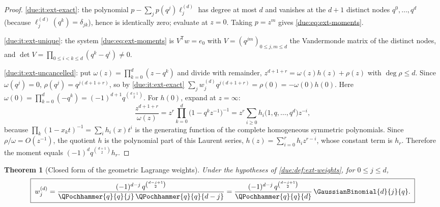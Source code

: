 \documentclass[11pt,oneside]{article}
\theoremstyle{plain}
\newtheorem{theorem}{Theorem}[section]
\theoremstyle{definition}
\theoremstyle{remark}
\newcommand{\Wrow}[2]{w^{(#1)}_{#2}}                        %
\begin{document}
\begin{proof}
\ref{due:it:ext-exact}: the polynomial $p-\sum_{j}p(q^{j})\ell^{(d)}_{j}$ has
degree at most $d$ and vanishes at the $d+1$ distinct nodes $q^{0},\ldots,q^{d}$
(because $\ell^{(d)}_{j}(q^{k})=\delta_{jk}$), hence is identically zero;
evaluate at $z=0$.  Taking $p=z^{m}$ gives \cref{due:eq:ext-moments}.

\ref{due:it:ext-unique}: the system \cref{due:eq:ext-moments} is
$V^{\mathsf T}w=e_{0}$ with $V=(q^{jm})_{0\le j,m\le d}$ the Vandermonde matrix
of the distinct nodes, and $\det V=\prod_{0\le i<k\le d}(q^{k}-q^{i})\neq0$.

\ref{due:it:ext-uncancelled}: put $\omega(z)=\prod_{k=0}^{d}(z-q^{k})$ and
divide with remainder, $z^{d+1+r}=\omega(z)h(z)+\rho(z)$ with
$\deg\rho\le d$.  Since $\omega(q^{j})=0$, $\rho(q^{j})=q^{j(d+1+r)}$, so
by \ref{due:it:ext-exact}
$\sum_{j}\Wrow{d}{j}q^{j(d+1+r)}=\rho(0)=-\omega(0)h(0)$.  Here
$\omega(0)=\prod_{k=0}^{d}(-q^{k})=(-1)^{d+1}q^{\binom{d+1}{2}}$.  For $h(0)$,
expand at $z=\infty$:
\[
 \frac{z^{d+1+r}}{\omega(z)}
 =z^{r}\prod_{k=0}^{d}\bigl(1-q^{k}z^{-1}\bigr)^{-1}
 =z^{r}\sum_{i\ge0}h_{i}\bigl(1,q,\ldots,q^{d}\bigr)z^{-i},
\]
because $\prod_{k}(1-x_{k}t)^{-1}=\sum_{i}h_{i}(x)t^{i}$ is the generating
function of the complete homogeneous symmetric polynomials.  Since
$\rho/\omega=O(z^{-1})$, the quotient $h$ is the polynomial part of this Laurent
series, $h(z)=\sum_{i=0}^{r}h_{i}z^{r-i}$, whose constant term is $h_{r}$.
Therefore the moment equals $(-1)^{d}q^{\binom{d+1}{2}}h_{r}$.
\end{proof}

\begin{theorem}[Closed form of the geometric Lagrange weights]
\label{due:thm:ext-weights}
Under the hypotheses of \cref{due:def:ext-weights}, for $0\le j\le d$,
\begin{equation}
 \boxed{\;
 \Wrow{d}{j}
 =\frac{(-1)^{d-j}\,q^{\binom{d-j+1}{2}}}
       {\QPochhammer{q}{q}{j}\,\QPochhammer{q}{q}{d-j}}
 =\frac{(-1)^{d-j}\,q^{\binom{d-j+1}{2}}}{\QPochhammer{q}{q}{d}}
  \,\GaussianBinomial{d}{j}{q}.\;}
 \label{due:eq:ext-weights}
\end{equation}
\end{theorem}
\end{document}
